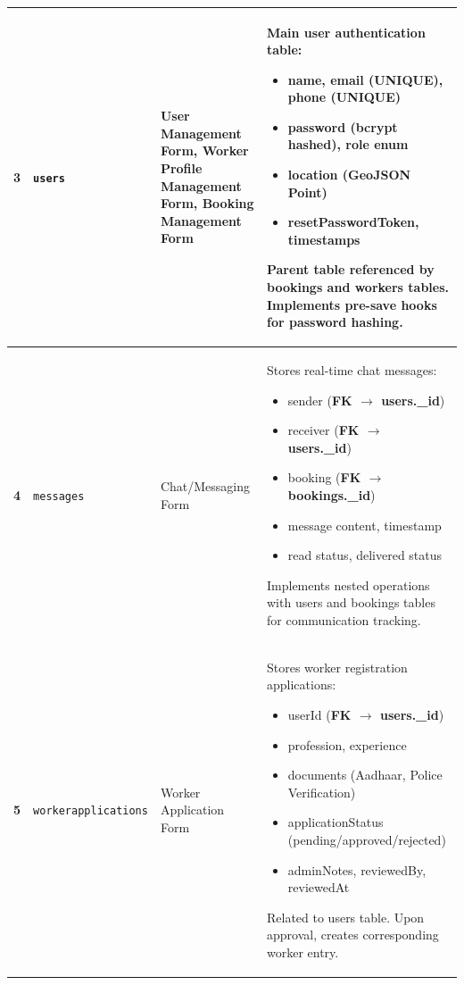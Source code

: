 \documentclass[12pt,a4paper]{article}
\begin{document}
\begin{longtable}{|>{\centering\arraybackslash}p{1cm}|p{3.5cm}|p{4.5cm}|p{6cm}|}
\rowcolor{lightgray}
\textbf{3} & \texttt{users} & User Management Form, Worker Profile Management Form, Booking Management Form & Main user authentication table:
\begin{itemize}
\item name, email (UNIQUE), phone (UNIQUE)
\item password (bcrypt hashed), role enum
\item location (GeoJSON Point)
\item resetPasswordToken, timestamps
\end{itemize}
\textbf{Parent table} referenced by bookings and workers tables. Implements pre-save hooks for password hashing. \\
\hline

\textbf{4} & \texttt{messages} & Chat/Messaging Form & Stores real-time chat messages:
\begin{itemize}
\item sender (\textbf{FK $\rightarrow$ users.\_id})
\item receiver (\textbf{FK $\rightarrow$ users.\_id})
\item booking (\textbf{FK $\rightarrow$ bookings.\_id})
\item message content, timestamp
\item read status, delivered status
\end{itemize}
Implements nested operations with users and bookings tables for communication tracking. \\
\hline

\rowcolor{lightgray}
\textbf{5} & \texttt{workerapplications} & Worker Application Form & Stores worker registration applications:
\begin{itemize}
\item userId (\textbf{FK $\rightarrow$ users.\_id})
\item profession, experience
\item documents (Aadhaar, Police Verification)
\item applicationStatus (pending/approved/rejected)
\item adminNotes, reviewedBy, reviewedAt
\end{itemize}
Related to users table. Upon approval, creates corresponding worker entry. \\
\hline


\end{longtable}
\end{document}
